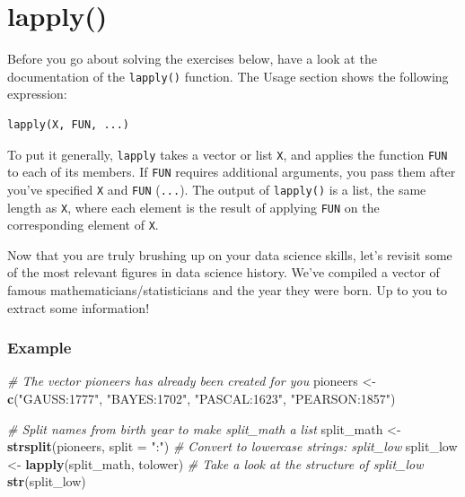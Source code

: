 \documentclass[
]{book}
\newenvironment{Shaded}{\begin{snugshade}}{\end{snugshade}}
\newcommand{\CommentTok}[1]{\textcolor[rgb]{0.56,0.35,0.01}{\textit{#1}}}
\newcommand{\DataTypeTok}[1]{\textcolor[rgb]{0.13,0.29,0.53}{#1}}
\newcommand{\KeywordTok}[1]{\textcolor[rgb]{0.13,0.29,0.53}{\textbf{#1}}}
\newcommand{\NormalTok}[1]{#1}
\newcommand{\StringTok}[1]{\textcolor[rgb]{0.31,0.60,0.02}{#1}}
\begin{document}
\hypertarget{lapply}{%
\section{lapply()}\label{lapply}}

Before you go about solving the exercises below, have a look at the documentation of the \texttt{lapply()} function. The Usage section shows the following expression:

\begin{verbatim}
lapply(X, FUN, ...)
\end{verbatim}

To put it generally, \texttt{lapply} takes a vector or list \texttt{X}, and applies the function \texttt{FUN} to each of its members. If \texttt{FUN} requires additional arguments, you pass them after you've specified \texttt{X} and \texttt{FUN} (\texttt{...}). The output of \texttt{lapply()} is a list, the same length as \texttt{X}, where each element is the result of applying \texttt{FUN} on the corresponding element of \texttt{X}.

Now that you are truly brushing up on your data science skills, let's revisit some of the most relevant figures in data science history. We've compiled a vector of famous mathematicians/statisticians and the year they were born. Up to you to extract some information!

\hypertarget{example}{%
\subsubsection{Example}\label{example}}

\begin{Shaded}
\begin{Highlighting}[]
\CommentTok{# The vector pioneers has already been created for you}
\NormalTok{pioneers <-}\StringTok{ }\KeywordTok{c}\NormalTok{(}\StringTok{"GAUSS:1777"}\NormalTok{, }\StringTok{"BAYES:1702"}\NormalTok{, }\StringTok{"PASCAL:1623"}\NormalTok{, }\StringTok{"PEARSON:1857"}\NormalTok{)}

\CommentTok{# Split names from birth year to make split_math a list}
\NormalTok{split_math <-}\StringTok{ }\KeywordTok{strsplit}\NormalTok{(pioneers, }\DataTypeTok{split =} \StringTok{":"}\NormalTok{)}
\CommentTok{# Convert to lowercase strings: split_low}
\NormalTok{split_low <-}\StringTok{ }\KeywordTok{lapply}\NormalTok{(split_math, tolower)}
\CommentTok{# Take a look at the structure of split_low}
\KeywordTok{str}\NormalTok{(split_low)}
\end{Highlighting}
\end{Shaded}
\end{document}
